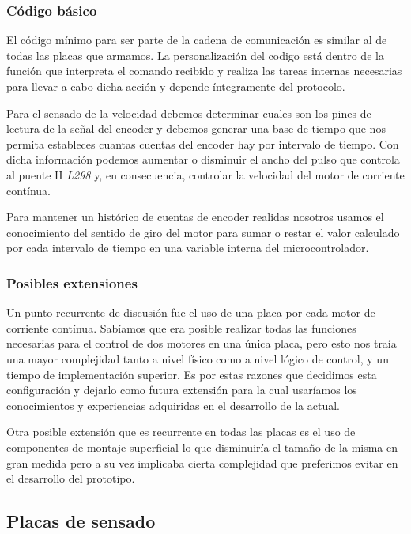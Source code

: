 \subsubsection{C\'odigo b\'asico}
\label{h_placas_motorDC_codigo}

El c\'odigo m\'inimo para ser parte de la cadena de comunicaci\'on es similar al de todas las placas que
armamos.
La personalizaci\'on del codigo est\'a dentro de la funci\'on que interpreta el comando recibido y realiza
las tareas internas necesarias para llevar a cabo dicha acci\'on y depende \'integramente del protocolo.

Para el sensado de la velocidad debemos determinar cuales son los pines de lectura de la se\~nal del encoder
y debemos generar una base de tiempo que nos permita estableces cuantas cuentas del encoder hay por intervalo
de tiempo.
Con dicha informaci\'on podemos aumentar o disminuir el ancho del pulso que controla al puente H \emph{L298}
y, en consecuencia, controlar la velocidad del motor de corriente cont\'inua.

Para mantener un hist\'orico de cuentas de encoder realidas nosotros usamos el conocimiento del sentido de giro
del motor para sumar o restar el valor calculado por cada intervalo de tiempo en una variable interna del
microcontrolador.

\subsubsection{Posibles extensiones}
\label{h_placas_motorDC_extensiones}

Un punto recurrente de discusi\'on fue el uso de una placa por cada motor de corriente cont\'inua.
Sab\'iamos que era posible realizar todas las funciones necesarias para el control de dos motores en una \'unica
placa, pero esto nos tra\'ia una mayor complejidad tanto a nivel f\'isico como a nivel l\'ogico de control, y un
tiempo de implementaci\'on superior.
Es por estas razones que decidimos esta configuraci\'on y dejarlo como futura extensi\'on para la cual usar\'iamos
los conocimientos y experiencias adquiridas en el desarrollo de la actual.

Otra posible extensi\'on que es recurrente en todas las placas es el uso de componentes de montaje superficial
lo que disminuir\'ia el tamaño de la misma en gran medida pero a su vez implicaba cierta complejidad que preferimos
evitar en el desarrollo del prototipo.

\subsection{Placas de sensado}
\label{h_placas_sensado}

